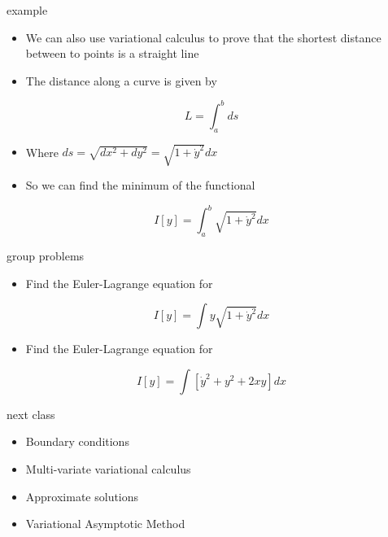\documentclass[12pt,handout]{beamer}
\providecommand{\tightlist}{%
  \setlength{\itemsep}{0pt}\setlength{\parskip}{0pt}}
\providecommand{\tightlist}{%
\setlength{\itemsep}{0pt}\setlength{\parskip}{0pt}}
\begin{document}
\begin{frame}{example}
\protect\hypertarget{example-1}{}
\begin{itemize}
\tightlist
\item
  We can also use variational calculus to prove that the shortest
  distance between to points is a straight line
\item
  The distance along a curve is given by
\end{itemize}

\[L = \int_a^b ds\]

\begin{itemize}
\tightlist
\item
  Where \(ds = \sqrt{dx^2 + dy^2} = \sqrt{1+ \dot{y}^2}dx\)
\item
  So we can find the minimum of the functional
\end{itemize}

\[I[y] = \int_a^b \sqrt{1+ \dot{y}^2}dx\]
\end{frame}

\begin{frame}{group problems}
\protect\hypertarget{group-problems}{}
\begin{itemize}
\tightlist
\item
  Find the Euler-Lagrange equation for
\end{itemize}

\[I[y] = \int y\sqrt{1+\dot{y}^2} dx\]

\begin{itemize}
\tightlist
\item
  Find the Euler-Lagrange equation for
\end{itemize}

\[I[y] = \int [\dot{y}^2 + y^2 + 2xy] dx\]
\end{frame}

\begin{frame}{next class}
\protect\hypertarget{next-class}{}
\begin{itemize}
\tightlist
\item
  Boundary conditions
\item
  Multi-variate variational calculus
\item
  Approximate solutions
\item
  Variational Asymptotic Method
\end{itemize}
\end{frame}
\end{document}
